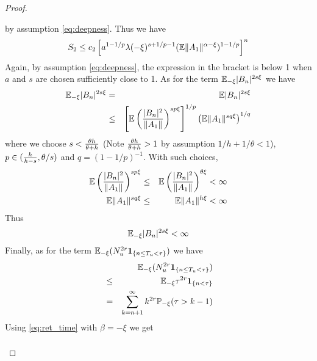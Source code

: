 \documentclass{article}
\theoremstyle{remark}
\begin{document}
\begin{proof}
\begin{enumerate}
\begin{enumerate}
\[      \]
      by assumption \eqref{eq:deepness}. Thus we have
      \begin{equation}
        \label{eq:S_2}
        S_2 \leq c_2 \left[
          a^{1 - 1/p} \lambda(-\xi)^{s + 1/p - 1}
          (\mathbb{E}\|A_1\|^{\alpha - \xi})^{1 - 1/p}
          \right]^n
      \end{equation}
      Again, by assumption \eqref{eq:deepness}, the expression in the
      bracket is below 1 when $a$ and $s$ are chosen sufficiently
      close to 1. As for the term $\mathbb{E}_{-\xi}|B_n|^{2s\xi}$ we have
      \begin{eqnarray*}
        \mathbb{E}_{-\xi}|B_n|^{2s\xi} &=& \mathbb{E}|B_n|^{2s\xi} \\
        &\leq& \left[
          \mathbb{E} \left(
             {
               |B_n|^2
               \over
               \|A_1\|
             }
          \right)^{sp\xi}
          \right]^{1/p} \left(
        \mathbb{E} \|A_1\|^{sq\xi}
        \right)^{1/q}
      \end{eqnarray*}
      where we choose $s < {\theta h \over \theta + h}$ (Note ${\theta
        h \over \theta + h} > 1$ by assumption $1/h + 1/\theta < 1$),
      $p \in ({h \over h - s}, \theta/s)$ and $q= (1 - 1/p)^{-1}$.
      With such choices,
      \begin{eqnarray*}
          \mathbb{E} \left(
             {
               |B_n|^2
               \over
               \|A_1\|
             }
             \right)^{sp\xi}
             &\leq&
         \mathbb{E} \left(
            {
              |B_n|^2
              \over
              \|A_1\|
            }
            \right)^{\theta\xi} < \infty \\
        \mathbb{E} \|A_1\|^{sq\xi} &\leq& \mathbb{E} \|A_1\|^{h\xi} < \infty
      \end{eqnarray*}
      Thus
      \begin{equation}
        \label{eq:B_n}
        \mathbb{E}_{-\xi}|B_n|^{2s\xi} < \infty
      \end{equation}
      Finally, as for the term
      $\mathbb{E}_{-\xi}(N_u^{2r}\mathbf{1}_{\{n \leq T_u < \tau\}})$
      we have
      \begin{eqnarray*}
        && \mathbb{E}_{-\xi}(N_u^{2r}\mathbf{1}_{\{n \leq T_u < \tau\}}) \\
        &\leq& \mathbb{E}_{-\xi} \tau^{2r} \mathbf{1}_{\{n < \tau\}} \\
        &=& \sum_{k=n+1}^\infty k^{2r}
        \mathbb{P}_{-\xi}(\tau > k-1) \\
      \end{eqnarray*}
      Using \eqref{eq:ret_time} with $\beta = -\xi$ we get
      \begin{eqnarray*}

\end{eqnarray*}
\end{enumerate}
\end{enumerate}
\end{proof}
\end{document}
